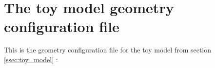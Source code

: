 
\section{The toy model geometry configuration file}\label{app:mapping:0}

This is the geometry configuration file for the toy model
from section \ref{ssec:toy_model} :


%



